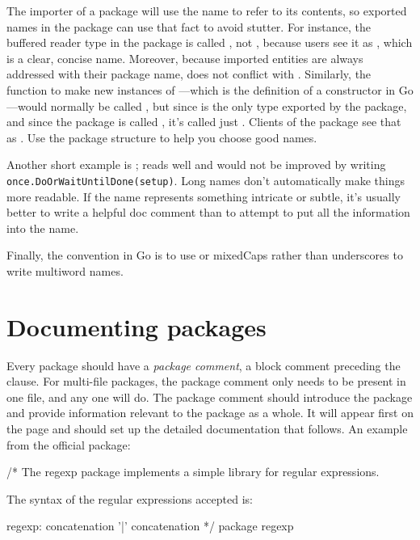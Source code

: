 The importer of a package will use the name to refer to its contents, so 
exported names in the package can use that fact to avoid
stutter. For instance, the buffered reader type in the
package is
called , not , because users see it as
,
which is a clear, concise name. Moreover, because imported entities are
always addressed with their package name,  does not conflict
with . Similarly, the function to make new instances of
---which is the definition of a constructor in Go---would normally
be called , but since  is the only type exported by the
package, and since the package is called
, it's called
just .
Clients of the package see that as . Use the package structure
to help you choose good names.

Another short example is ;  reads well and would
not be improved by writing \lstinline{once.DoOrWaitUntilDone(setup)}. Long names
don't automatically make things more readable. If the name represents
something intricate or subtle, it's usually better to write a helpful
doc comment than to attempt to put all the information into the name.

Finally, the convention in Go is to use  or mixedCaps rather
than underscores to write multiword names.


\section{Documenting packages}
Every package should have a \emph{package comment}, a block comment preceding the
 clause. For multi-file packages, the package comment only needs to be
present in one file, and any one will do. The package comment should introduce
the package and provide information relevant to the package as a whole. It will
appear first on the  page and should set up the detailed documentation
that follows. An example from the official  package:
\begin{display}
/*
    The regexp package implements a simple library for
    regular expressions.

    The syntax of the regular expressions accepted is:

    regexp:
        concatenation { '|' concatenation }
*/
package regexp
\end{display}

